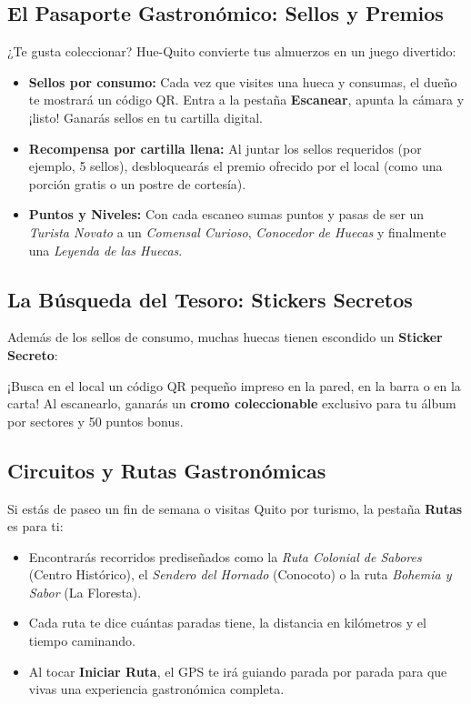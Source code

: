 \documentclass[11pt, a4paper, oneside]{article}
\begin{document}
\subsection{El Pasaporte Gastronómico: Sellos y Premios}
¿Te gusta coleccionar? Hue-Quito convierte tus almuerzos en un juego divertido:
\begin{itemize}
  \item \textbf{Sellos por consumo:} Cada vez que visites una hueca y consumas, el dueño te mostrará un código QR. Entra a la pestaña \textbf{Escanear}, apunta la cámara y ¡listo! Ganarás sellos en tu cartilla digital.
  \item \textbf{Recompensa por cartilla llena:} Al juntar los sellos requeridos (por ejemplo, 5 sellos), desbloquearás el premio ofrecido por el local (como una porción gratis o un postre de cortesía).
  \item \textbf{Puntos y Niveles:} Con cada escaneo sumas puntos y pasas de ser un \textit{Turista Novato} a un \textit{Comensal Curioso}, \textit{Conocedor de Huecas} y finalmente una \textit{Leyenda de las Huecas}.
\end{itemize}

\subsection{La Búsqueda del Tesoro: Stickers Secretos}
Además de los sellos de consumo, muchas huecas tienen escondido un \textbf{Sticker Secreto}:
\begin{tipbox}
¡Busca en el local un código QR pequeño impreso en la pared, en la barra o en la carta! Al escanearlo, ganarás un \textbf{cromo coleccionable} exclusivo para tu álbum por sectores y 50 puntos bonus.
\end{tipbox}

\subsection{Circuitos y Rutas Gastronómicas}
Si estás de paseo un fin de semana o visitas Quito por turismo, la pestaña \textbf{Rutas} es para ti:
\begin{itemize}
  \item Encontrarás recorridos prediseñados como la \textit{Ruta Colonial de Sabores} (Centro Histórico), el \textit{Sendero del Hornado} (Conocoto) o la ruta \textit{Bohemia y Sabor} (La Floresta).
  \item Cada ruta te dice cuántas paradas tiene, la distancia en kilómetros y el tiempo caminando.
  \item Al tocar \textbf{Iniciar Ruta}, el GPS te irá guiando parada por parada para que vivas una experiencia gastronómica completa.
\end{itemize}
\end{document}
